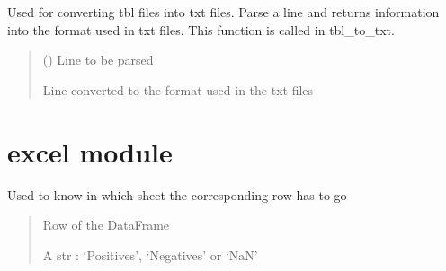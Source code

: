 \documentclass[letterpaper,10pt,english]{sphinxmanual}
\begin{document}

\begin{fulllineitems}
\label{\detokenize{converter:converter.traducer}}
\pysigstartsignatures
{}
\pysigstopsignatures
\sphinxAtStartPar
Used for converting tbl files into txt files. Parse a line and returns information into the format used in txt files.
This function is called in tbl\_to\_txt.
\begin{quote}\begin{description}
\sphinxAtStartPar
{} () \textendash{} Line to be parsed

\sphinxAtStartPar
Line converted to the format used in the txt files

\end{description}\end{quote}

\end{fulllineitems}


\sphinxstepscope


\chapter{excel module}
\label{\detokenize{excel:module-excel}}\label{\detokenize{excel:excel-module}}\label{\detokenize{excel::doc}}

\begin{fulllineitems}
\label{\detokenize{excel:excel.classify_row}}
\pysigstartsignatures
{}
\pysigstopsignatures
\sphinxAtStartPar
Used to know in which sheet the corresponding row has to go
\begin{quote}\begin{description}
\sphinxAtStartPar
{} \textendash{} Row of the DataFrame

\sphinxAtStartPar
A str : ‘Positives’, ‘Negatives’ or ‘NaN’

\end{description}\end{quote}

\end{fulllineitems}
\end{document}
